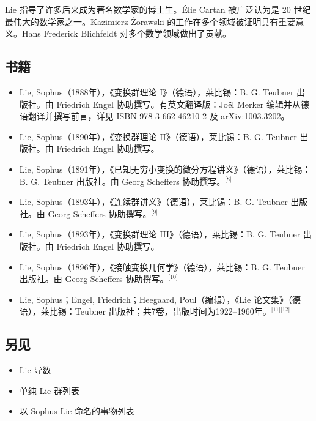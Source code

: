 Lie 指导了许多后来成为著名数学家的博士生。Élie Cartan 被广泛认为是 20 世纪最伟大的数学家之一。Kazimierz Żorawski 的工作在多个领域被证明具有重要意义。Hans Frederick Blichfeldt 对多个数学领域做出了贡献。
\subsection{书籍}
\begin{itemize}
\item Lie, Sophus（1888年），《变换群理论 I》（德语），莱比锡：B. G. Teubner 出版社。由 Friedrich Engel 协助撰写。有英文翻译版：Joël Merker 编辑并从德语翻译并撰写前言，详见 ISBN 978-3-662-46210-2 及 arXiv:1003.3202。
\item Lie, Sophus（1890年），《变换群理论 II》（德语），莱比锡：B. G. Teubner 出版社。由 Friedrich Engel 协助撰写。
\item Lie, Sophus（1891年），《已知无穷小变换的微分方程讲义》（德语），莱比锡：B. G. Teubner 出版社。由 Georg Scheffers 协助撰写。\(^\text{[8]}\)
\item Lie, Sophus（1893年），《连续群讲义》（德语），莱比锡：B. G. Teubner 出版社。由 Georg Scheffers 协助撰写。\(^\text{[9]}\)
\item Lie, Sophus（1893年），《变换群理论 III》（德语），莱比锡：B. G. Teubner 出版社。由 Friedrich Engel 协助撰写。
\item Lie, Sophus（1896年），《接触变换几何学》（德语），莱比锡：B. G. Teubner 出版社。由 Georg Scheffers 协助撰写。\(^\text{[10]}\)
\item Lie, Sophus；Engel, Friedrich；Heegaard, Poul（编辑），《Lie 论文集》（德语），莱比锡：Teubner 出版社；共7卷，出版时间为1922–1960年。\(^\text{[11][12]}\)
\end{itemize}
\subsection{另见}
\begin{itemize}
\item Lie 导数
\item 单纯 Lie 群列表
\item 以 Sophus Lie 命名的事物列表
\end{itemize}
